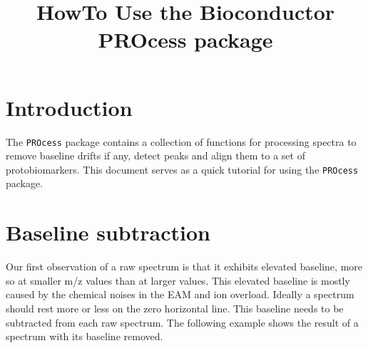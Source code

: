 \documentclass[12pt]{article}
\begin{document}
\title{HowTo Use the Bioconductor PROcess package}
\author{}
\maketitle
\tableofcontents


\section{Introduction}
The {\tt PROcess} package contains a collection of functions for 
processing spectra to remove baseline drifts if any, detect
peaks and align them to a set of protobiomarkers. This document 
serves as a quick tutorial for using the {\tt PROcess} package.

\section{Baseline subtraction}
Our first observation of a raw spectrum is that it exhibits
elevated baseline, more so at smaller m/z values than at larger
values. This elevated baseline
is mostly caused by the chemical noises in the EAM and ion
overload. Ideally a spectrum should rest more
or less on the zero horizontal line.  This baseline needs to
be subtracted from each raw spectrum. The following example 
shows the result of a spectrum with its baseline removed. 
\end{document}

